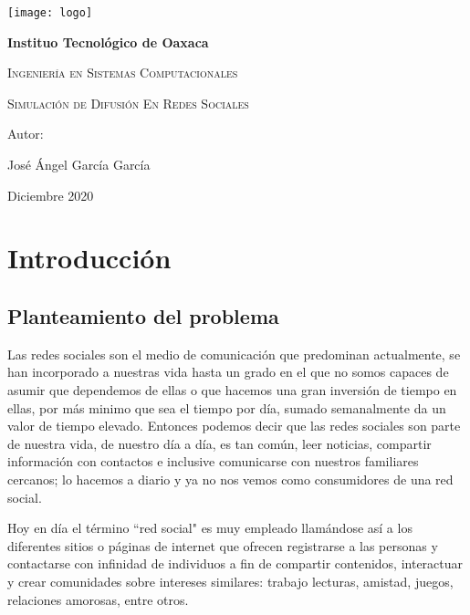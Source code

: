 \documentclass{article}
\begin{document}
	
	
	
	\begin{titlepage}
		\centering
		{\texttt{[image: logo]}\par}
		\vspace{1cm}
		{\bfseries\LARGE Instituo Tecnológico de Oaxaca \par}
		\vspace{1cm}
		{\scshape\Large Ingeniería en Sistemas Computacionales  \par}
		\vspace{3cm}
		{\scshape\Huge Simulación de Difusión En Redes Sociales \par}
		\vspace{3cm}
		\vfill
		{\Large Autor: \par}
		{\Large José Ángel García García \par}
		\vfill
		{\Large Diciembre 2020 \par}
		\end{titlepage}
	
\tableofcontents
\newpage
	
\section{Introducción}
 
 \subsection{Planteamiento del problema}
 Las redes sociales son el medio de comunicación que predominan actualmente, se han incorporado a nuestras vida hasta un grado en el que no somos capaces de asumir que dependemos de ellas o que hacemos una gran inversión de tiempo en ellas, por más minimo que sea el tiempo por día, sumado semanalmente da un valor de tiempo elevado. Entonces podemos decir que las redes sociales son parte de nuestra vida, de nuestro día a día, es tan común, leer noticias, compartir información con contactos e inclusive comunicarse con nuestros familiares cercanos; lo hacemos a diario y ya no nos vemos como consumidores de una red social.
  
 Hoy en día el término “red social" es muy empleado llamándose así a los diferentes sitios o páginas de internet que ofrecen registrarse a las personas y contactarse con infinidad de individuos a fin  de compartir contenidos, interactuar y crear comunidades sobre intereses similares: trabajo lecturas, amistad, juegos, relaciones amorosas, entre otros.
\end{document}
